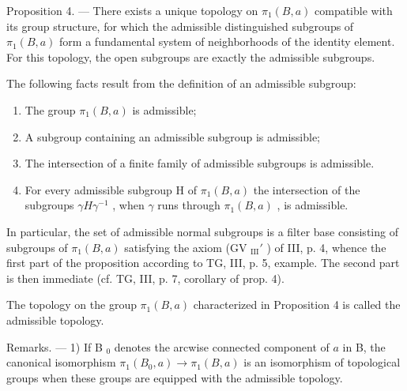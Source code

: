 Proposition 4. — There exists a unique topology on \(\pi_1(B, a)\) compatible with its group structure, for which the admissible distinguished subgroups of \(\pi_1(B, a)\) form a fundamental system of neighborhoods of the identity element. For this topology, the open subgroups are exactly the admissible subgroups.

The following facts result from the definition of an admissible subgroup:

\begin{enumerate}
\def\labelenumi{\alph{enumi})}
\item
  The group \(\pi_1(B, a)\) is admissible;
\item
  A subgroup containing an admissible subgroup is admissible;
\item
  The intersection of a finite family of admissible subgroups is admissible.
\item
  For every admissible subgroup H of \(\pi_{1}(B,a)\) the intersection of the subgroups \(\gamma H\gamma^{-1}\) , when \(\gamma\) runs through \(\pi_{1}(B,a)\) , is admissible.
\end{enumerate}

In particular, the set of admissible normal subgroups is a filter base consisting of subgroups of \(\pi_1(B,a)\) satisfying the axiom (GV \(_{\text{III}}'\) ) of III, p. 4, whence the first part of the proposition according to TG, III, p. 5, example. The second part is then immediate (cf. TG, III, p. 7, corollary of prop. 4).

The topology on the group \(\pi_{1}(B,a)\) characterized in Proposition 4 is called the admissible topology.

Remarks. --- 1) If B \(_{0}\) denotes the arcwise connected component of \(a\) in B, the canonical isomorphism \(\pi_{1}(B_{0}, a) \to \pi_{1}(B, a)\) is an isomorphism of topological groups when these groups are equipped with the admissible topology.

